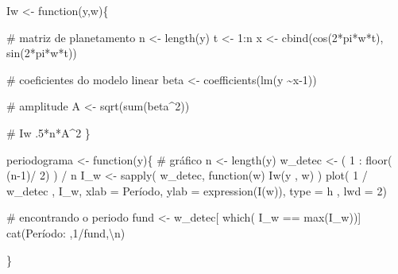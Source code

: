 \documentclass[
  letterpaper,
  DIV=11,
  numbers=noendperiod]{scrreprt}
\newenvironment{Shaded}{\begin{snugshade}}{\end{snugshade}}
\newcommand{\AttributeTok}[1]{\textcolor[rgb]{0.40,0.45,0.13}{#1}}
\newcommand{\CommentTok}[1]{\textcolor[rgb]{0.37,0.37,0.37}{#1}}
\newcommand{\ControlFlowTok}[1]{\textcolor[rgb]{0.00,0.23,0.31}{#1}}
\newcommand{\DecValTok}[1]{\textcolor[rgb]{0.68,0.00,0.00}{#1}}
\newcommand{\FunctionTok}[1]{\textcolor[rgb]{0.28,0.35,0.67}{#1}}
\newcommand{\NormalTok}[1]{\textcolor[rgb]{0.00,0.23,0.31}{#1}}
\newcommand{\OtherTok}[1]{\textcolor[rgb]{0.00,0.23,0.31}{#1}}
\newcommand{\SpecialCharTok}[1]{\textcolor[rgb]{0.37,0.37,0.37}{#1}}
\newcommand{\StringTok}[1]{\textcolor[rgb]{0.13,0.47,0.30}{#1}}
\begin{document}
\begin{Shaded}
\begin{Highlighting}[]
\NormalTok{Iw }\OtherTok{\textless{}{-}} \ControlFlowTok{function}\NormalTok{(y,w)\{}

  \CommentTok{\# matriz de planetamento}
\NormalTok{  n }\OtherTok{\textless{}{-}} \FunctionTok{length}\NormalTok{(y)}
\NormalTok{  t }\OtherTok{\textless{}{-}} \DecValTok{1}\SpecialCharTok{:}\NormalTok{n}
\NormalTok{  x }\OtherTok{\textless{}{-}} \FunctionTok{cbind}\NormalTok{(}\FunctionTok{cos}\NormalTok{(}\DecValTok{2}\SpecialCharTok{*}\NormalTok{pi}\SpecialCharTok{*}\NormalTok{w}\SpecialCharTok{*}\NormalTok{t), }\FunctionTok{sin}\NormalTok{(}\DecValTok{2}\SpecialCharTok{*}\NormalTok{pi}\SpecialCharTok{*}\NormalTok{w}\SpecialCharTok{*}\NormalTok{t))}
  
  \CommentTok{\# coeficientes do modelo linear}
\NormalTok{  beta }\OtherTok{\textless{}{-}} \FunctionTok{coefficients}\NormalTok{(}\FunctionTok{lm}\NormalTok{(y }\SpecialCharTok{\textasciitilde{}}\NormalTok{x}\DecValTok{{-}1}\NormalTok{))}
  
  \CommentTok{\# amplitude}
\NormalTok{  A }\OtherTok{\textless{}{-}} \FunctionTok{sqrt}\NormalTok{(}\FunctionTok{sum}\NormalTok{(beta}\SpecialCharTok{\^{}}\DecValTok{2}\NormalTok{))}
  
  \CommentTok{\# Iw}
\NormalTok{  .}\DecValTok{5}\SpecialCharTok{*}\NormalTok{n}\SpecialCharTok{*}\NormalTok{A}\SpecialCharTok{\^{}}\DecValTok{2}
\NormalTok{\}}

\NormalTok{periodograma }\OtherTok{\textless{}{-}} \ControlFlowTok{function}\NormalTok{(y)\{}
  \CommentTok{\# gráfico}
\NormalTok{  n }\OtherTok{\textless{}{-}} \FunctionTok{length}\NormalTok{(y)}
\NormalTok{  w\_detec }\OtherTok{\textless{}{-}}\NormalTok{ ( }\DecValTok{1} \SpecialCharTok{:} \FunctionTok{floor}\NormalTok{(  (n}\DecValTok{{-}1}\NormalTok{)}\SpecialCharTok{/} \DecValTok{2}\NormalTok{) ) }\SpecialCharTok{/}\NormalTok{ n}
\NormalTok{  I\_w }\OtherTok{\textless{}{-}} \FunctionTok{sapply}\NormalTok{( w\_detec, }\ControlFlowTok{function}\NormalTok{(w) }\FunctionTok{Iw}\NormalTok{(y , w) )}
  \FunctionTok{plot}\NormalTok{( }\DecValTok{1} \SpecialCharTok{/}\NormalTok{ w\_detec , I\_w, }\AttributeTok{xlab =} \StringTok{\textquotesingle{}Período\textquotesingle{}}\NormalTok{, }\AttributeTok{ylab =}     \FunctionTok{expression}\NormalTok{(}\FunctionTok{I}\NormalTok{(w)), }\AttributeTok{type =} \StringTok{\textquotesingle{}h\textquotesingle{}}\NormalTok{ , }\AttributeTok{lwd =} \DecValTok{2}\NormalTok{)}
  
  \CommentTok{\# encontrando o periodo}
\NormalTok{  fund }\OtherTok{\textless{}{-}}\NormalTok{  w\_detec[ }\FunctionTok{which}\NormalTok{( I\_w }\SpecialCharTok{==} \FunctionTok{max}\NormalTok{(I\_w))]}
  \FunctionTok{cat}\NormalTok{(}\StringTok{\textquotesingle{}Período: \textquotesingle{}}\NormalTok{,}\DecValTok{1}\SpecialCharTok{/}\NormalTok{fund,}\StringTok{\textquotesingle{}}\SpecialCharTok{\textbackslash{}n}\StringTok{\textquotesingle{}}\NormalTok{)}

\NormalTok{\}}
\end{Highlighting}
\end{Shaded}
\end{document}
